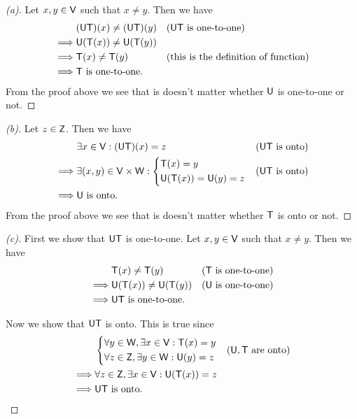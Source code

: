 \begin{proof}[(a)]
	Let \(x, y \in \mathsf{V}\) such that \(x \neq y\).
	Then we have
	\begin{align*}
		         & (\mathsf{U} \mathsf{T})(x) \neq (\mathsf{U} \mathsf{T})(y) &  & \text{(\(\mathsf{U}\mathsf{T}\) is one-to-one)}            \\
		\implies & \mathsf{U}(\mathsf{T}(x)) \neq \mathsf{U}(\mathsf{T}(y))                                                    \\
		\implies & \mathsf{T}(x) \neq \mathsf{T}(y)           &  & \text{(this is the definition of function)} \\
		\implies & \mathsf{T} \text{ is one-to-one}.
	\end{align*}
	From the proof above we see that is doesn't matter whether \(\mathsf{U}\) is one-to-one or not.
\end{proof}

\begin{proof}[(b)]
	Let \(z \in \mathsf{Z}\).
	Then we have
	\begin{align*}
		         & \exists x \in \mathsf{V} : (\mathsf{U} \mathsf{T})(x) = z                &  & \text{(\(\mathsf{U}\mathsf{T}\) is onto)} \\
		\implies & \exists (x, y) \in \mathsf{V} \times \mathsf{W} : \begin{dcases}
			                                             \mathsf{T}(x) = y \\
			                                             \mathsf{U}(\mathsf{T}(x)) = \mathsf{U}(y) = z
		                                             \end{dcases} &  & \text{(\(\mathsf{U}\mathsf{T}\) is onto)}   \\
		\implies & \mathsf{U} \text{ is onto}.
	\end{align*}
	From the proof above we see that is doesn't matter whether \(\mathsf{T}\) is onto or not.
\end{proof}

\begin{proof}[(c)]
	First we show that \(\mathsf{U} \mathsf{T}\) is one-to-one.
	Let \(x, y \in \mathsf{V}\) such that \(x \neq y\).
	Then we have
	\begin{align*}
		         & \mathsf{T}(x) \neq \mathsf{T}(y)             &  & \text{(\(\mathsf{T}\) is one-to-one)} \\
		\implies & \mathsf{U}(\mathsf{T}(x)) \neq \mathsf{U}(\mathsf{T}(y))     &  & \text{(\(\mathsf{U}\) is one-to-one)} \\
		\implies & \mathsf{U} \mathsf{T} \text{ is one-to-one}.
	\end{align*}

	Now we show that \(\mathsf{U} \mathsf{T}\) is onto.
	This is true since
	\begin{align*}
		         & \begin{dcases}
			           \forall y \in \mathsf{W}, \exists x \in \mathsf{V} : \mathsf{T}(x) = y \\
			           \forall z \in \mathsf{Z}, \exists y \in \mathsf{W} : \mathsf{U}(y) = z
		           \end{dcases}     &  & \text{(\(\mathsf{U}, \mathsf{T}\) are onto)}     \\
		\implies & \forall z \in \mathsf{Z}, \exists x \in \mathsf{V} : \mathsf{U}(\mathsf{T}(x)) = z \\
		\implies & \mathsf{U} \mathsf{T} \text{ is onto}.
	\end{align*}
\end{proof}

